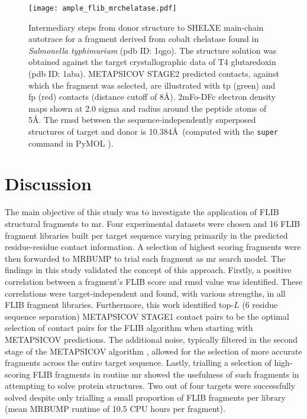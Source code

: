 \begin{figure}[H]
	\centering
	\texttt{[image: ample\_flib\_mrchelatase.pdf]}
	\caption[Example of FLIB fragment to MR solution]{Intermediary steps from donor structure to SHELXE main-chain autotrace for a fragment derived from cobalt chelatase found in \textit{Salmonella typhimurium} (\gls{pdb} ID: 1qgo). The structure solution was obtained against the target crystallographic data of T4 glutaredoxin (\gls{pdb} ID: 1aba). METAPSICOV STAGE2 predicted contacts, against which the fragment was selected, are illustrated with \acrlong{tp} (green) and \acrlong{fp} (red) contacts (distance cutoff of 8\AA). 2mFo-DFc electron density maps shown at 2.0 sigma and radius around the peptide atoms of 5\AA. The \gls{rmsd} between the sequence-independently superposed structures of target and donor is 10.384\AA\ (computed with the \texttt{super} command in PyMOL \cite{Delano2002-hm}).}
	\label{fig:ample_flib_mrchelatase}
\end{figure}

\section{Discussion}
The main objective of this study was to investigate the application of FLIB structural fragments to \gls{mr}. Four experimental datasets were chosen and 16 FLIB fragment libraries built per target sequence varying primarily in the predicted residue-residue contact information. A selection of highest scoring fragments were then forwarded to MRBUMP to trial each fragment as \gls{mr} search model. The findings in this study validated the concept of this approach. Firstly, a positive correlation between a fragment's FLIB score and \gls{rmsd} value was identified. These correlations were target-independent and found, with various strengths, in all FLIB fragment libraries. Furthermore, this work identified top-$L$ (6 residue sequence separation) METAPSICOV STAGE1 contact pairs to be the optimal selection of contact pairs for the FLIB algorithm when starting with METAPSICOV predictions. The additional noise, typically filtered in the second stage of the METAPSICOV algorithm \cite{Jones2015-vq}, allowed for the selection of more accurate fragments across the entire target sequence. Lastly, trialling a selection of high-scoring FLIB fragments in routine \gls{mr} showed the usefulness of such fragments in attempting to solve protein structures. Two out of four targets were successfully solved despite  only trialling a small proportion of FLIB fragments per library (mean MRBUMP runtime of 10.5 CPU hours per fragment).


